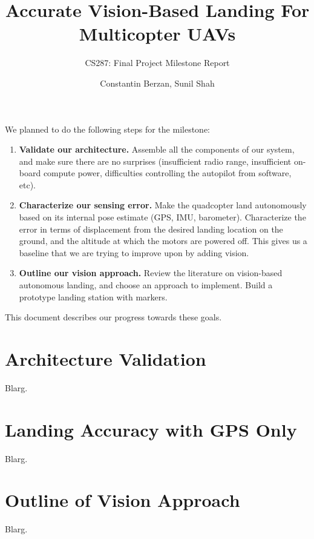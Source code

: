 \documentclass[10pt, twocolumn]{scrartcl} %
\title{Accurate Vision-Based Landing For Multicopter UAVs}
\subtitle{CS287: Final Project Milestone Report}
\author{Constantin Berzan, Sunil Shah}
\date{}
\begin{document}
\maketitle
We planned to do the following steps for the milestone:

\begin{enumerate}

\item {\bf Validate our architecture.} Assemble all the components of our
system, and make sure there are no surprises (insufficient radio range,
insufficient on-board compute power, difficulties controlling the autopilot
from software, etc).

\item {\bf Characterize our sensing error.} Make the quadcopter land
autonomously based on its internal pose estimate (GPS, IMU, barometer).
Characterize the error in terms of displacement from the desired landing
location on the ground, and the altitude at which the motors are powered off.
This gives us a baseline that we are trying to improve upon by adding vision.

\item {\bf Outline our vision approach.} Review the literature on vision-based
autonomous landing, and choose an approach to implement. Build a prototype
landing station with markers.

\end{enumerate}

This document describes our progress towards these goals.

\section{Architecture Validation}

Blarg.

\section{Landing Accuracy with GPS Only}

Blarg.

\section{Outline of Vision Approach}

Blarg.
\end{document}
